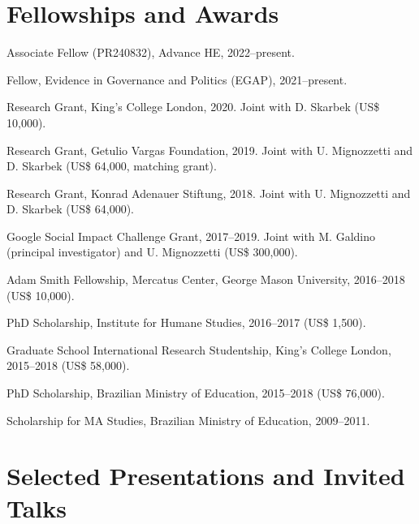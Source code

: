 \documentclass[a4paper]{article}
\renewenvironment{itemize}{
	\begin{list}{}{
			\setlength{\leftmargin}{1.5em}
		}
		}{
	\end{list}
}
\begin{document}
\section*{Fellowships and Awards}

\begin{itemize}
\item Associate Fellow (PR240832), Advance HE, 2022--present.
\item Fellow, Evidence in Governance and Politics (EGAP), 2021--present.
\item Research Grant, King's College London, 2020. Joint with D. Skarbek (US\$ 10,000).
\item Research Grant, Getulio Vargas Foundation, 2019. Joint with U. Mignozzetti and D. Skarbek (US\$ 64,000, matching grant).
\item Research Grant, Konrad Adenauer Stiftung, 2018. Joint with U. Mignozzetti and D. Skarbek (US\$ 64,000).
\item Google Social Impact Challenge Grant, 2017--2019. Joint with M. Galdino (principal investigator) and U. Mignozzetti (US\$ 300,000).
\item Adam Smith Fellowship, Mercatus Center, George Mason University, 2016--2018 (US\$ 10,000).
\item PhD Scholarship, Institute for Humane Studies, 2016--2017 (US\$ 1,500).
\item Graduate School International Research Studentship, King's College London, 2015--2018 (US\$ 58,000).
\item PhD Scholarship, Brazilian Ministry of Education, 2015--2018 (US\$ 76,000).
\item Scholarship for MA Studies, Brazilian Ministry of Education, 2009--2011.
\end{itemize}

\section*{Selected Presentations and Invited Talks}
\end{document}
